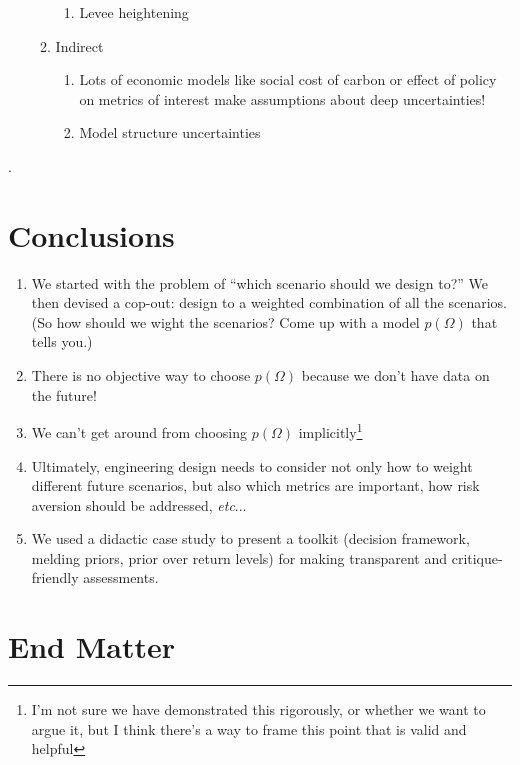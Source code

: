 \documentclass[12pt]{article}
\makeatletter
\DeclareRobustCommand\onedot{\futurelet\@let@token\@onedot}
\def\@onedot{\ifx\@let@token.\else.\null\fi\xspace}
\def\etc{\emph{etc}\onedot} \def\vs{\emph{vs}\onedot}
\makeatother
\begin{document}
\begin{enumerate}
\begin{enumerate}
\begin{enumerate}
                        \item Levee heightening \citep{garner_slrise:2018,oddo_coastal:2017,vandantzig_dike:1956}
                    \end{enumerate}
              \item Indirect
                    \begin{enumerate}
                        \item Lots of economic models like social cost of carbon or effect of policy on metrics of interest make assumptions about deep uncertainties!
                        \item Model structure uncertainties
                    \end{enumerate}
          \end{enumerate}
\end{enumerate}.

\section{Conclusions}

\begin{enumerate}
    \item We started with the problem of ``which scenario should we design to?'' We then devised a cop-out: design to a weighted combination of all the scenarios. (So how should we wight the scenarios? Come up with a model $p(\Omega)$ that tells you.)
    \item There is no objective way to choose $p(\Omega)$ because we don't have data on the future!
    \item We can't get around from choosing $p(\Omega)$ implicitly\footnote{I'm not sure we have demonstrated this rigorously, or whether we want to argue it, but I think there's a way to frame this point that is valid and helpful}
    \item Ultimately, engineering design needs to consider not only how to weight different future scenarios, but also which metrics are important, how risk aversion should be addressed, \etc.
    \item We used a didactic case study to present a toolkit (decision framework, melding priors, prior over return levels) for making transparent and critique-friendly assessments.
\end{enumerate}

\section*{End Matter}
\end{document}
